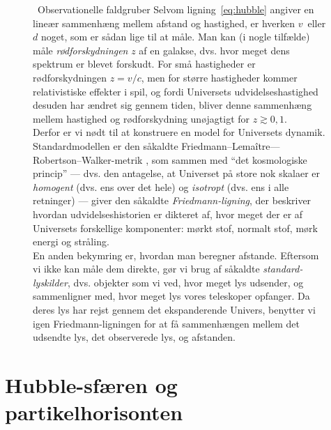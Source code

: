 \documentclass[useAMS,danish]{aa}
\def\vrec{\mbox{$v$}}
\begin{document}
\begin{figure}[!t]
\begin{bclogo}[
    couleur=gray!20,
    epBord=1,
    arrondi=0.1,
    logo=\bcinfo,
    marge=8,
    ombre=false, %
    couleurBord=gray!60,
    barre=line]
    { \ \textsf{Observationelle faldgruber}}
    \small{\textsf{
        Selvom ligning~\ref{eq:hubble} angiver en lineær sammenhæng mellem afstand og hastighed, er hverken \vrec\ eller $d$ noget, som er sådan lige til at måle.
        Man kan (i nogle tilfælde) måle \emph{rødforskydningen} $z$ af en galakse, dvs. hvor meget dens spektrum er blevet forskudt.
        For små hastigheder er rødforskydningen $z=\vrec/c$, men for større hastigheder kommer relativistiske effekter i spil, og fordi Universets udvidelseshastighed desuden har ændret sig gennem tiden, bliver denne sammenhæng mellem hastighed og rødforskydning unøjagtigt for $z\gtrsim0,\!1$.\vspace{1mm}\\
        Derfor er vi nødt til at konstruere en model for Universets dynamik.
        Standardmodellen er den såkaldte Friedmann--Lemaître---Robertson--Walker-metrik \citep{Friedmann1922,Lemaitre1927,Robertson1935,Robertson1936a,Robertson1936b,Walker1937}, som sammen med ``det kosmologiske princip'' --- dvs. den antagelse, at Universet på store nok skalaer er \emph{homogent} (dvs. ens over det hele) og \emph{isotropt} (dvs. ens i alle retninger) --- giver den såkaldte \emph{Friedmann-ligning}, der beskriver hvordan udvidelseshistorien er dikteret af, hvor meget der er af Universets forskellige komponenter: mørkt stof, normalt stof, mørk energi og stråling.\vspace{1mm}\\
        En anden bekymring er, hvordan man beregner afstande.
        Eftersom vi ikke kan måle dem direkte, gør vi brug af såkaldte \emph{standard-lyskilder}, dvs. objekter som vi ved, hvor meget lys udsender, og sammenligner med, hvor meget lys vores teleskoper opfanger.
        Da deres lys har rejst gennem det ekspanderende Univers, benytter vi igen Friedmann-ligningen for at få sammenhængen mellem det udsendte lys, det observerede lys, og afstanden.
    }}
\label{info:obs-faldgrube}
\end{bclogo}
     \endminipage
\end{figure}

\section{Hubble-sfæren og partikelhorisonten}
\label{sec:dH-dP}
\end{document}
